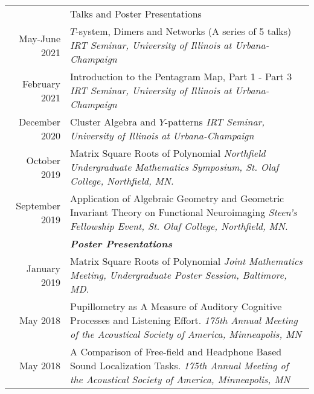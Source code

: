 \documentclass[letterpaper, 11pt]{article}
\newcommand{\headingfont}{\Large\color{Red}}
\newenvironment{SectionTable}[1]{
	\renewcommand*{\arraystretch}{1.7}
	\setlength{\tabcolsep}{10pt}
	\begin{longtable}{Rp{5.2in}} & #1 \\}
	{\end{longtable}\vspace{-.3cm}}
\begin{document}
\begin{SectionTable}{\headingfont Talks and Poster Presentations}
		May-June 2021 &
		$T$-system, Dimers and Networks (A series of 5 talks) \newline
		\textit{IRT Seminar, University of Illinois at Urbana-Champaign} \\
		

		February 2021 &
		Introduction to the Pentagram Map, Part 1 - Part 3 \newline
		\textit{IRT Seminar, University of Illinois at Urbana-Champaign} \\
		
		December 2020 &
		Cluster Algebra and $Y$-patterns \newline
		\textit{IRT Seminar, University of Illinois at Urbana-Champaign} \\
		
		
		October 2019 &
		Matrix Square Roots of Polynomial \newline
		\textit{Northfield Undergraduate Mathematics Symposium, St. Olaf College, Northfield, MN.} \\


		September 2019 &
		Application of Algebraic Geometry and Geometric Invariant Theory on Functional Neuroimaging \newline
		\textit{Steen’s Fellowship Event, St. Olaf College, Northfield, MN.} \\	


		& \textit{\textbf{Poster Presentations}}\\
		
		January 2019 &
		Matrix Square Roots of Polynomial \newline
		\textit{Joint Mathematics Meeting, Undergraduate Poster Session, Baltimore, MD.} \\
		
		May 2018 &
		Pupillometry as A Measure of Auditory Cognitive Processes and Listening Effort. \newline
		\textit{175th Annual Meeting of the Acoustical Society of America, Minneapolis, MN} \\
		
		May 2018 &
		A Comparison of Free-field and Headphone Based Sound Localization Tasks. \newline
		\textit{175th Annual Meeting of the Acoustical Society of America, Minneapolis, MN} \\
		
	\end{SectionTable}
	
	
\end{document}
